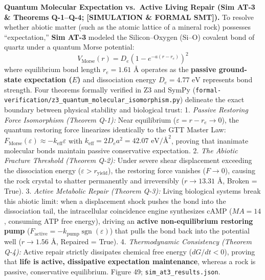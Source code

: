 \documentclass[
]{article}
\begin{document}
\textbf{Quantum Molecular Expectation vs.~Active Living Repair (Sim AT-3
\& Theorems Q-1--Q-4; {[}SIMULATION \& FORMAL SMT{]}).} To resolve
whether abiotic matter (such as the atomic lattice of a mineral rock)
possesses ``expectation,'' \textbf{Sim AT-3} modeled the Silicon--Oxygen
(Si--O) covalent bond of quartz under a quantum Morse potential:
\begin{equation}
V_{\mathrm{Morse}}(r) = D_e \left(1 - e^{-a(r - r_e)}\right)^2
\end{equation}
where equilibrium bond length \(r_e = 1.61\text{ \AA}\) operates as the
\textbf{passive ground-state expectation (\(E\))} and dissociation
energy \(D_e = 4.77\text{ eV}\) represents bond strength. Four theorems
formally verified in Z3 and SymPy
(\texttt{formal-verification/z3\_quantum\_molecular\_isomorphism.py})
delineate the exact boundary between physical stability and biological
trust: 1. \emph{Passive Restoring Force Isomorphism (Theorem Q-1):} Near
equilibrium (\(\varepsilon = r - r_e \to 0\)), the quantum restoring
force linearizes identically to the GTT Master Law:
\(F_{\mathrm{Morse}}(\varepsilon) \approx -k_{\mathrm{eff}} \varepsilon\)
with \(k_{\mathrm{eff}} = 2 D_e a^2 = 42.07\text{ eV/\AA}^2\), proving
that inanimate molecular bonds maintain passive conservative
expectation. 2. \emph{The Abiotic Fracture Threshold (Theorem Q-2):}
Under severe shear displacement exceeding the dissociation energy
(\(\varepsilon > r_{\mathrm{yield}}\)), the restoring force vanishes
(\(F \to 0\)), causing the rock crystal to shatter permanently and
irreversibly (\(r \to 13.31\text{ \AA}\), Broken = True). 3.
\emph{Active Metabolic Repair (Theorem Q-3):} Living biological systems
break this abiotic limit: when a displacement shock pushes the bond into
the dissociation tail, the intracellular coincidence engine synthesizes
cAMP (\(MA=14\), consuming ATP free energy), driving an \textbf{active
non-equilibrium restoring pump}
(\(F_{\mathrm{active}} = -k_{\mathrm{pump}} \operatorname{sgn}(\varepsilon)\))
that pulls the bond back into the potential well
(\(r \to 1.56\text{ \AA}\), Repaired = True). 4. \emph{Thermodynamic
Consistency (Theorem Q-4):} Active repair strictly dissipates chemical
free energy (\(dG/dt < 0\)), proving that \textbf{life is active,
dissipative expectation maintenance}, whereas a rock is passive,
conservative equilibrium. Figure 49; \texttt{sim\_at3\_results.json}.
\end{document}
